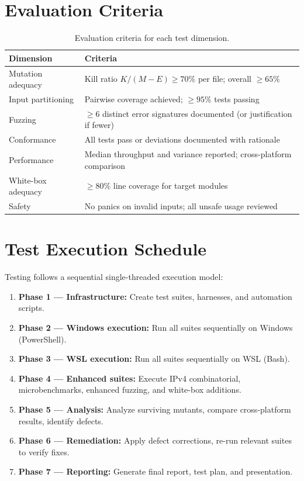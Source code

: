\documentclass[11pt,a4paper]{article}
\begin{document}
\section{Evaluation Criteria}

\begin{table}[H]
\centering
\caption{Evaluation criteria for each test dimension.}
\begin{tabularx}{\textwidth}{lX}
\toprule
\textbf{Dimension} & \textbf{Criteria} \\
\midrule
Mutation adequacy     & Kill ratio $K/(M-E) \geq 70\%$ per file; overall $\geq 65\%$ \\
Input partitioning    & Pairwise coverage achieved; $\geq 95\%$ tests passing \\
Fuzzing               & $\geq 6$ distinct error signatures documented (or justification if fewer) \\
Conformance           & All tests pass or deviations documented with rationale \\
Performance           & Median throughput and variance reported; cross-platform comparison \\
White-box adequacy    & $\geq 80\%$ line coverage for target modules \\
Safety                & No panics on invalid inputs; all unsafe usage reviewed \\
\bottomrule
\end{tabularx}
\end{table}

\section{Test Execution Schedule}

Testing follows a sequential single-threaded execution model:

\begin{enumerate}[noitemsep]
\item \textbf{Phase 1 --- Infrastructure:} Create test suites, harnesses, and automation scripts.
\item \textbf{Phase 2 --- Windows execution:} Run all suites sequentially on Windows (PowerShell).
\item \textbf{Phase 3 --- WSL execution:} Run all suites sequentially on WSL (Bash).
\item \textbf{Phase 4 --- Enhanced suites:} Execute IPv4 combinatorial, microbenchmarks, enhanced fuzzing, and white-box additions.
\item \textbf{Phase 5 --- Analysis:} Analyze surviving mutants, compare cross-platform results, identify defects.
\item \textbf{Phase 6 --- Remediation:} Apply defect corrections, re-run relevant suites to verify fixes.
\item \textbf{Phase 7 --- Reporting:} Generate final report, test plan, and presentation.
\end{enumerate}
\end{document}
